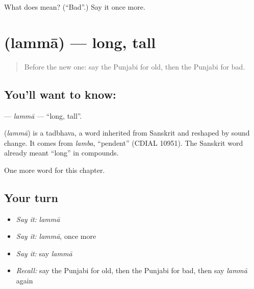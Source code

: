 \begin{tcolorbox}[breakable,colback=teal!4,colframe=teal!35!black,title={Before you move on}]
What does  mean? (\textquotedblleft{}Bad\textquotedblright{}.) Say it once more.
\end{tcolorbox}
\section[\texorpdfstring{\pa{ਲੰਮਾ} (lammā)}{ਲੰਮਾ (lammā)}]{ (lammā) — long, tall}

\label{lesson:PA-C80-lamma}



\begin{quote}
Before the new one: say the Punjabi for old, then the Punjabi for bad.
\end{quote}

\subsection*{You'll want to know: }
\textbf{} — \emph{lammā} — \textquotedblleft{}long, tall\textquotedblright{}.

\begin{cousinweb}
\textbf{} (\emph{lammā}) is a tadbhava, a word inherited from Sanskrit and reshaped by sound change. It comes from \emph{lamba}, \textquotedblleft{}pendent\textquotedblright{} (CDIAL 10951). The Sanskrit word already meant \textquotedblleft{}long\textquotedblright{} in compounds.
\end{cousinweb}

\begin{grammarlens}[title={What you've built}]
One more word for this chapter.
\end{grammarlens}

\subsection*{Your turn}
\begin{itemize}
\raggedright
  \item \emph{Say it:} \emph{lammā}
  \item \emph{Say it:} \emph{lammā}, once more
  \item \emph{Say it:} say \emph{lammā}
  \item \emph{Recall:} say the Punjabi for old, then the Punjabi for bad, then say \emph{lammā} again
\end{itemize}

